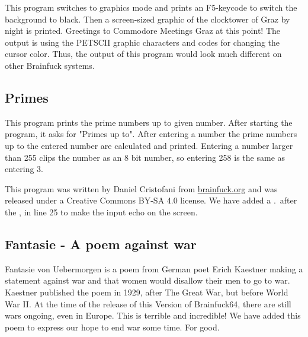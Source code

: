 \documentclass[ms,article,a4paper]{memoir}
\begin{document}
This program switches to graphics mode and prints an F5-keycode to switch the background to black. Then a screen-sized graphic of the clocktower of Graz by night is printed. Greetings to Commodore Meetings Graz at this point! The output is using the PETSCII graphic characters and codes for changing the cursor color. Thus, the output of this program would look much different on other Brainfuck systems.

\subsection{Primes}

This program prints the prime numbers up to given number. After starting the program, it asks for "Primes up to". After entering a number the prime numbers up to the entered number are calculated and printed. Entering a number larger than 255 clips the number as an 8 bit number, so entering 258 is the same as entering 3.

This program was written by Daniel Cristofani from \url{brainfuck.org} and was released under a Creative Commons BY-SA 4.0 license. We have added a .\ after the , in line 25 to make the input echo on the screen.

\subsection{Fantasie - A poem against war}

Fantasie von Uebermorgen is a poem from German poet Erich Kaestner making a statement against war and that women would disallow their men to go to war. Kaestner published the poem in 1929, after The Great War, but before World War II. At the time of the release of this Version of Brainfuck64, there are still wars ongoing, even in Europe. This is terrible and incredible! We have added this poem to express our hope to end war some time. For good.
\end{document}
